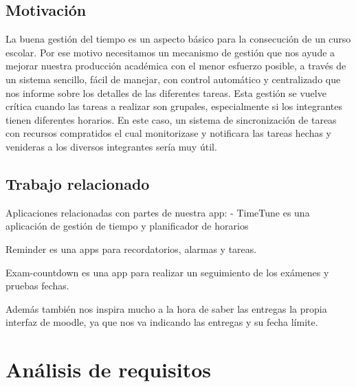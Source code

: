 \documentclass[a4paper,openright,12pt]{article}
\begin{document}
\subsection{Motivación}
La buena gestión del tiempo es un aspecto básico para la consecución de un curso escolar. Por ese motivo necesitamos un mecanismo de gestión que nos ayude a mejorar nuestra producción académica con el menor esfuerzo posible, a través de un sistema sencillo, fácil de manejar, con control automático y centralizado que nos informe sobre los detalles de las diferentes tareas. 
Esta gestión se vuelve crítica cuando las tareas a realizar son grupales, especialmente si los integrantes tienen diferentes horarios. En este caso, un sistema de sincronización de tareas con recursos compratidos el cual monitorizase y notificara las tareas hechas y venideras a los diversos integrantes sería muy útil.
\subsection{Trabajo relacionado}
Aplicaciones relacionadas con partes de nuestra app:
- TimeTune es una aplicación de gestión de tiempo y planificador de horarios \cite{misc-url1}

Reminder es una apps para recordatorios, alarmas y tareas. \cite{misc-url2}

Exam-countdown es una app para realizar un seguimiento de los exámenes y pruebas fechas.\cite{misc-url3}

Además también nos inspira mucho a la hora de saber las entregas la propia interfaz de moodle, ya que nos va indicando las entregas y su fecha límite.

\section{Análisis de requisitos}

\end{document}
